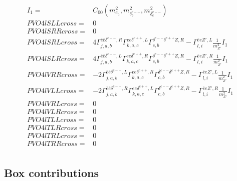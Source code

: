 \documentclass[A4,landscape]{article}
\begin{document}
\begin{align} 
I_1= & C_{00}(m^2_{e_{{a}}}, m^2_{\delta^{c--}_{{b}}}, m^2_{\delta^{c--}_{{c}}}) \\ 
  PVO4lSLLcross= & 0 \\ 
  PVO4lSRRcross= & 0 \\ 
  PVO4lSRLcross= & 4  \Gamma^{\bar{e}\bar{e}\delta^{c--} ,R}_{j, a, b} \Gamma^{e e \delta^{c++},L}_{k, a, c} \Gamma^{\delta^{c--} \delta^{c++}Z ,R}_{c, b} - \Gamma^{\bar{e}e {Z'} ,L} _{l, i} \frac{1}{m^2_{{Z'}}} I_1 \\ 
  PVO4lSLRcross= & 4  \Gamma^{\bar{e}\bar{e}\delta^{c--} ,L}_{j, a, b} \Gamma^{e e \delta^{c++},R}_{k, a, c} \Gamma^{\delta^{c--} \delta^{c++}Z ,R}_{c, b} - \Gamma^{\bar{e}e {Z'} ,R} _{l, i} \frac{1}{m^2_{{Z'}}} I_1 \\ 
  PVO4lVRRcross= & -2  \Gamma^{\bar{e}\bar{e}\delta^{c--} ,L}_{j, a, b} \Gamma^{e e \delta^{c++},R}_{k, a, c} \Gamma^{\delta^{c--} \delta^{c++}Z ,R}_{c, b} - \Gamma^{\bar{e}e {Z'} ,L} _{l, i} \frac{1}{m^2_{{Z'}}} I_1 \\ 
  PVO4lVLLcross= & -2  \Gamma^{\bar{e}\bar{e}\delta^{c--} ,R}_{j, a, b} \Gamma^{e e \delta^{c++},L}_{k, a, c} \Gamma^{\delta^{c--} \delta^{c++}Z ,R}_{c, b} - \Gamma^{\bar{e}e {Z'} ,R} _{l, i} \frac{1}{m^2_{{Z'}}} I_1 \\ 
  PVO4lVRLcross= & 0 \\ 
  PVO4lVLRcross= & 0 \\ 
  PVO4lTLLcross= & 0 \\ 
  PVO4lTLRcross= & 0 \\ 
  PVO4lTRLcross= & 0 \\ 
  PVO4lTRRcross= & 0 \\ 
\end{align} 
\subsection{Box contributions} 
\end{document}

